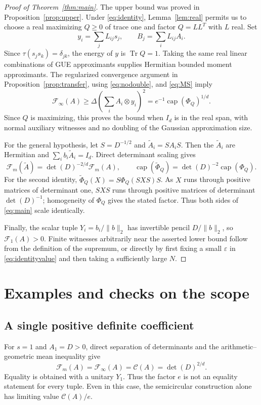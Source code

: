 \documentclass[11pt]{article}
\newcommand{\Tr}{\operatorname{Tr}}
\newcommand{\capop}{\operatorname{cap}}
\newcommand{\F}{\mathcal F}
\newcommand{\K}{\mathcal C}
\begin{document}
\begin{proof}[Proof of Theorem~\ref{thm:main}]
The upper bound was proved in Proposition~\ref{prop:upper}. Under \eqref{eq:identity}, Lemma~\ref{lem:real} permits us to choose a real maximizing $Q\ge0$ of trace one and factor $Q=LL^T$ with $L$ real. Set
\[
 y_i=\sum_jL_{ij}s_j,\qquad B_j=\sum_iL_{ij}A_i.
\]
Since $\tau(s_js_k)=\delta_{jk}$, the energy of $y$ is $\Tr Q=1$. Taking the same real linear combinations of GUE approximants supplies Hermitian bounded moment approximants. The regularized convergence argument in Proposition~\ref{prop:transfer}, using \eqref{eq:nodouble}, and \eqref{eq:MS} imply
\[
 \F_\infty(A)\ge\Delta\left(\sum_iA_i\otimes y_i\right)^2
 =e^{-1}\capop(\Phi_Q)^{1/d}.
\]
Since $Q$ is maximizing, this proves the bound when $I_d$ is in the real span, with normal auxiliary witnesses and no doubling of the Gaussian approximation size.

For the general hypothesis, let $S=D^{-1/2}$ and $\widetilde A_i=SA_iS$. Then the $\widetilde A_i$ are Hermitian and $\sum_i b_i\widetilde A_i=I_d$. Direct determinant scaling gives
\begin{equation}\label{eq:scaling}
 \F_m(\widetilde A)=\det(D)^{-2/d}\F_m(A),\qquad
 \capop(\widetilde\Phi_Q)=\det(D)^{-2}\capop(\Phi_Q).
\end{equation}
For the second identity, $\widetilde\Phi_Q(X)=S\Phi_Q(SXS)S$. As $X$ runs through positive matrices of determinant one, $SXS$ runs through positive matrices of determinant $\det(D)^{-1}$; homogeneity of $\Phi_Q$ gives the stated factor. Thus both sides of \eqref{eq:main} scale identically.

Finally, the scalar tuple $Y_i=b_i/\|b\|_2$ has invertible pencil $D/\|b\|_2$, so $\F_1(A)>0$. Finite witnesses arbitrarily near the asserted lower bound follow from the definition of the supremum, or directly by first fixing a small $\varepsilon$ in \eqref{eq:identityvalue} and then taking a sufficiently large $N$.
\end{proof}

\section{Examples and checks on the scope}
\subsection{A single positive definite coefficient}
For $s=1$ and $A_1=D>0$, direct separation of determinants and the arithmetic--geometric mean inequality give
\[
 \F_m(A)=\F_\infty(A)=\K(A)=\det(D)^{2/d}.
\]
Equality is obtained with a unitary $Y_1$. Thus the factor $e$ is not an equality statement for every tuple. Even in this case, the semicircular construction alone has limiting value $\K(A)/e$.
\end{document}
